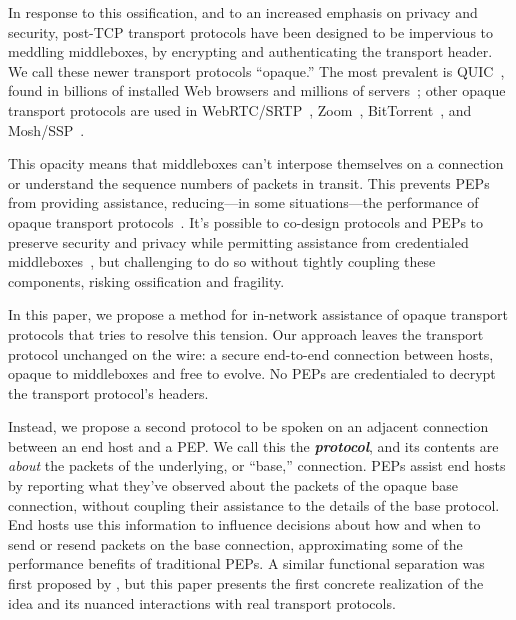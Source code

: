 In response to this ossification, and to an increased emphasis on
privacy and security, post-TCP transport protocols have been designed to be
impervious to meddling middleboxes, by encrypting and
authenticating the transport header. We call these newer transport
protocols ``opaque.'' The most prevalent
is QUIC~\cite{rfc9000}, found in billions of
installed Web browsers and millions of servers~\cite{zirngibl2021quicdeployment};
other opaque transport protocols are used in WebRTC/SRTP~\cite{rfc8834webrtc},
Zoom~\cite{zoom}, BitTorrent~\cite{bittorrent}, and Mosh/SSP~\cite{winstein2012mosh}.

This opacity means that middleboxes can't interpose themselves on a
connection or understand the sequence
numbers of packets in transit.  This prevents PEPs
from providing assistance, reducing---in some situations---the
performance of opaque transport
protocols~\cite{border2020quicsat-presentation,kuhn2021quic-over-sat,martin2022bbr-quic-sat,border2022evaluating,kosek2022quicpep}.
It's possible to co-design protocols and PEPs to
preserve security and privacy while permitting assistance
from credentialed middleboxes~\cite{ford2008logjam,sherry2015blindbox,
  dogar2012tapa,iyengar2009flow}, but challenging to do so without tightly
coupling these components, risking ossification and fragility.

In this paper, we propose a method for in-network assistance of opaque
transport protocols that tries to resolve this tension. Our approach leaves
the transport protocol unchanged on the wire: a secure end-to-end connection between hosts, opaque to middleboxes and free to
evolve. No PEPs are credentialed to decrypt the transport protocol's
headers.

Instead, we propose a second protocol to be spoken on an adjacent
connection between an end host and a PEP.
We call this the \emph{\bf \sys protocol}, and its contents
are \emph{about} the packets of the underlying, or ``base,'' connection.
\Sys PEPs assist end hosts by reporting what they've observed about the packets of
the opaque base connection, without coupling their assistance to the
details of the base protocol. End hosts use this information
to influence decisions about how and when to send or resend packets on
the base connection, approximating some of the performance benefits of traditional PEPs.
A similar functional separation was first proposed by \cite{yuan2022sidecar},
but this paper presents the first concrete realization of the idea and its
nuanced interactions with real transport protocols.

